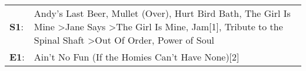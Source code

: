 \begin{supertabular}{p{0.03\textwidth}p{0.92\textwidth}}
 \textbf{S1}:  &  Andy's Last Beer\textsuperscript{}, \enspace Mullet (Over)\textsuperscript{}, \enspace Hurt Bird Bath\textsuperscript{}, \enspace The Girl Is Mine\textsuperscript{} \textgreater \enspace Jane Says\textsuperscript{} \textgreater \enspace The Girl Is Mine\textsuperscript{}, \enspace Jam[1]\textsuperscript{}, \enspace Tribute to the Spinal Shaft\textsuperscript{} \textgreater \enspace Out Of Order\textsuperscript{}, \enspace Power of Soul\textsuperscript{}  \enspace  \\
 \textbf{E1}:  &                                                                                                                                                                                                                                                                                                                                                                                                          Ain't No Fun (If the Homies Can't Have None)[2]\textsuperscript{}  \enspace  \\
\end{supertabular}
